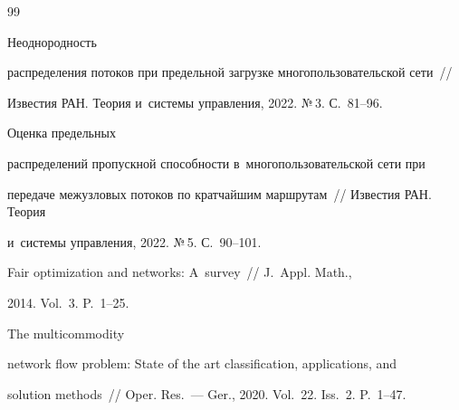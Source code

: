 {\small\frenchspacing


{%




\begin{thebibliography}{99}





\vspace*{-2pt}


    




 Неоднородность 


распределения потоков при предельной загрузке  многопользовательской сети~/\!\!/ 


Известия РАН. Теория и~сис\-те\-мы управ\-ле\-ния, 2022. №\,3. С.~81--96.







 Оценка предельных 


распределений  пропускной способности в~многопользовательской сети при  


передаче  межузловых потоков  по кратчайшим  маршрутам~/\!\!/ Известия РАН. Теория 


и~системы управления, 2022. №\,5. С.~90--101.







 Fair optimization and networks: A~survey~/\!\!/ J.~Appl. Math., 


2014. Vol.~3. P.~1--25.


    




 The multicommodity 


network flow problem: State of the art classification, applications, and 


solution methods~/\!\!/ Oper. Res.~--- Ger., 2020. Vol.~22. Iss.~2.  P.~1--47.








\end{thebibliography}}}
